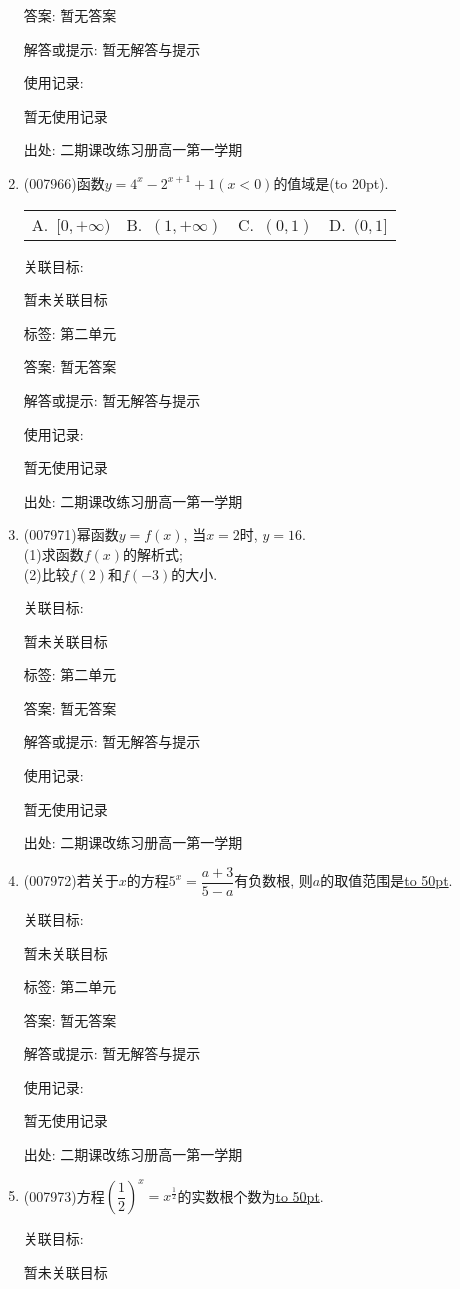 \documentclass[10pt,a4paper]{article}
\newcommand{\blank}[1]{\underline{\hbox to #1pt{}}}
\newcommand{\bracket}[1]{(\hbox to #1pt{})}
\newcommand{\fourch}[4]{\par\begin{tabular}{p{.23\textwidth}p{.23\textwidth}p{.23\textwidth}p{.23\textwidth}}
A.~#1 &B.~#2& C.~#3& D.~#4
\end{tabular}}
\begin{document}
\begin{enumerate}[1.]
答案: 暂无答案

解答或提示: 暂无解答与提示

使用记录:

暂无使用记录


出处: 二期课改练习册高一第一学期
\item { (007966)}函数$y=4^x-2^{x+1}+1(x<0)$的值域是\bracket{20}.
\fourch{$[0,+\infty)$}{$(1,+\infty)$}{$(0,1)$}{$(0,1]$}


关联目标:

暂未关联目标



标签: 第二单元

答案: 暂无答案

解答或提示: 暂无解答与提示

使用记录:

暂无使用记录


出处: 二期课改练习册高一第一学期
\item { (007971)}幂函数$y=f(x)$, 当$x=2$时, $y=16$.\\
(1)求函数$f(x)$的解析式;\\
(2)比较$f(2)$和$f(-3)$的大小.


关联目标:

暂未关联目标



标签: 第二单元

答案: 暂无答案

解答或提示: 暂无解答与提示

使用记录:

暂无使用记录


出处: 二期课改练习册高一第一学期
\item { (007972)}若关于$x$的方程$5^x=\dfrac{a+3}{5-a}$有负数根, 则$a$的取值范围是\blank{50}.


关联目标:

暂未关联目标



标签: 第二单元

答案: 暂无答案

解答或提示: 暂无解答与提示

使用记录:

暂无使用记录


出处: 二期课改练习册高一第一学期
\item { (007973)}方程$(\dfrac 12)^x=x^{\frac 12}$的实数根个数为\blank{50}.


关联目标:

暂未关联目标




\end{enumerate}
\end{document}
